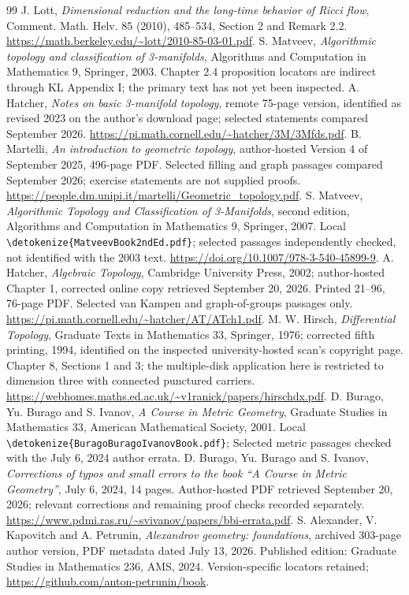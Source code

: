 \documentclass[10pt]{amsbook}
\DeclareRobustCommand{\code}[1]{\expandafter\nolinkurl\expandafter{\detokenize{#1}}}
\numberwithin{section}{chapter}
\numberwithin{equation}{chapter}
\begin{document}
\begin{thebibliography}{99}
 J. Lott, \emph{Dimensional reduction
and the long-time behavior of Ricci flow}, Comment. Math. Helv. 85 (2010),
485--534, Section 2 and Remark 2.2.
\url{https://math.berkeley.edu/~lott/2010-85-03-01.pdf}.
 S. Matveev, \emph{Algorithmic topology and
classification of 3-manifolds}, Algorithms and Computation in Mathematics 9,
Springer, 2003. Chapter 2.4 proposition locators are indirect through KL
Appendix I; the primary text has not yet been inspected.
 A. Hatcher, \emph{Notes on basic
3-manifold topology}, remote 75-page version, identified as revised 2023
on the author's download page; selected statements compared September 2026.
\url{https://pi.math.cornell.edu/~hatcher/3M/3Mfds.pdf}.
 B. Martelli, \emph{An introduction to geometric
 topology}, author-hosted Version 4 of September 2025, 496-page PDF.
Selected filling and graph passages compared September 2026; exercise
statements are not supplied proofs.
\url{https://people.dm.unipi.it/martelli/Geometric_topology.pdf}.
 S. Matveev, \emph{Algorithmic Topology and
Classification of 3-Manifolds}, second edition, Algorithms and Computation
in Mathematics 9, Springer, 2007. Local \code{MatveevBook2ndEd.pdf};
selected passages independently checked, not identified with the 2003 text.
\url{https://doi.org/10.1007/978-3-540-45899-9}.
 A. Hatcher, \emph{Algebraic Topology},
Cambridge University Press, 2002; author-hosted Chapter 1, corrected
online copy retrieved September 20, 2026. Printed 21--96, 76-page PDF.
Selected van Kampen and graph-of-groups passages only.
\url{https://pi.math.cornell.edu/~hatcher/AT/ATch1.pdf}.
 M. W. Hirsch, \emph{Differential Topology},
Graduate Texts in Mathematics 33, Springer, 1976; corrected fifth printing,
1994, identified on the inspected university-hosted scan's copyright page.
Chapter 8, Sections 1 and 3; the multiple-disk application here is restricted
to dimension three with connected punctured carriers.
\url{https://webhomes.maths.ed.ac.uk/~v1ranick/papers/hirschdx.pdf}.
 D. Burago, Yu. Burago and S. Ivanov,
\emph{A Course in Metric Geometry}, Graduate Studies in Mathematics 33,
American Mathematical Society, 2001. Local \code{BuragoBuragoIvanovBook.pdf};
Selected metric passages checked with the July 6, 2024 author errata.
 D. Burago, Yu. Burago and S. Ivanov,
\emph{Corrections of typos and small errors to the book ``A Course in
Metric Geometry''}, July 6, 2024, 14 pages. Author-hosted PDF retrieved
September 20, 2026; relevant corrections and remaining proof checks
recorded separately.
\url{https://www.pdmi.ras.ru/~svivanov/papers/bbi-errata.pdf}.
 S. Alexander, V. Kapovitch and A. Petrunin,
\emph{Alexandrov geometry: foundations}, archived 303-page author version,
PDF metadata dated July 13, 2026. Published edition: Graduate Studies
in Mathematics 236, AMS, 2024. Version-specific locators retained;
\url{https://github.com/anton-petrunin/book}.


\end{thebibliography}
\end{document}
